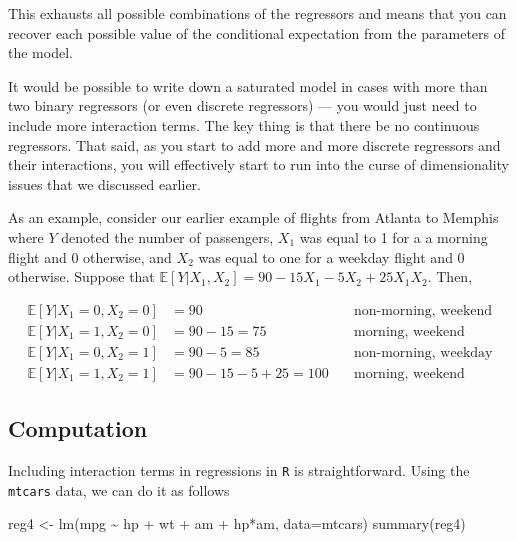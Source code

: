 \documentclass[
  letterpaper,
  DIV=11,
  numbers=noendperiod]{scrreprt}
\newenvironment{Shaded}{\begin{snugshade}}{\end{snugshade}}
\newcommand{\AttributeTok}[1]{\textcolor[rgb]{0.40,0.45,0.13}{#1}}
\newcommand{\FunctionTok}[1]{\textcolor[rgb]{0.28,0.35,0.67}{#1}}
\newcommand{\NormalTok}[1]{\textcolor[rgb]{0.00,0.23,0.31}{#1}}
\newcommand{\OtherTok}[1]{\textcolor[rgb]{0.00,0.23,0.31}{#1}}
\newcommand{\SpecialCharTok}[1]{\textcolor[rgb]{0.37,0.37,0.37}{#1}}
\begin{document}
\begin{itemize}
  This exhausts all possible combinations of the regressors and means
  that you can recover each possible value of the conditional
  expectation from the parameters of the model.

  It would be possible to write down a saturated model in cases with
  more than two binary regressors (or even discrete regressors) --- you
  would just need to include more interaction terms. The key thing is
  that there be no continuous regressors. That said, as you start to add
  more and more discrete regressors and their interactions, you will
  effectively start to run into the curse of dimensionality issues that
  we discussed earlier.

  As an example, consider our earlier example of flights from Atlanta to
  Memphis where \(Y\) denoted the number of passengers, \(X_1\) was
  equal to 1 for a a morning flight and 0 otherwise, and \(X_2\) was
  equal to one for a weekday flight and 0 otherwise. Suppose that
  \(\mathbb{E}[Y|X_1,X_2] = 90 - 15 X_1 - 5 X_2 + 25 X_1 X_2\). Then,

  \[
    \begin{aligned}
      \mathbb{E}[Y|X_1=0,X_2=0] &= 90 \quad & \textrm{non-morning, weekend} \\
      \mathbb{E}[Y|X_1=1,X_2=0] &= 90 - 15 = 75 \quad & \textrm{morning, weekend} \\
      \mathbb{E}[Y|X_1=0,X_2=1] &= 90 - 5 = 85 \quad  & \textrm{non-morning, weekday} \\
      \mathbb{E}[Y|X_1=1,X_2=1] &= 90 - 15 - 5 + 25 = 100 \quad & \textrm{morning, weekend}
    \end{aligned}
    \]
\end{itemize}

\subsection{Computation}\label{computation-4}

Including interaction terms in regressions in \texttt{R} is
straightforward. Using the \texttt{mtcars} data, we can do it as follows

\begin{Shaded}
\begin{Highlighting}[]
\NormalTok{reg4 }\OtherTok{\textless{}{-}} \FunctionTok{lm}\NormalTok{(mpg }\SpecialCharTok{\textasciitilde{}}\NormalTok{ hp }\SpecialCharTok{+}\NormalTok{ wt }\SpecialCharTok{+}\NormalTok{ am }\SpecialCharTok{+}\NormalTok{ hp}\SpecialCharTok{*}\NormalTok{am, }\AttributeTok{data=}\NormalTok{mtcars)}
\FunctionTok{summary}\NormalTok{(reg4)}
\end{Highlighting}
\end{Shaded}
\end{document}
